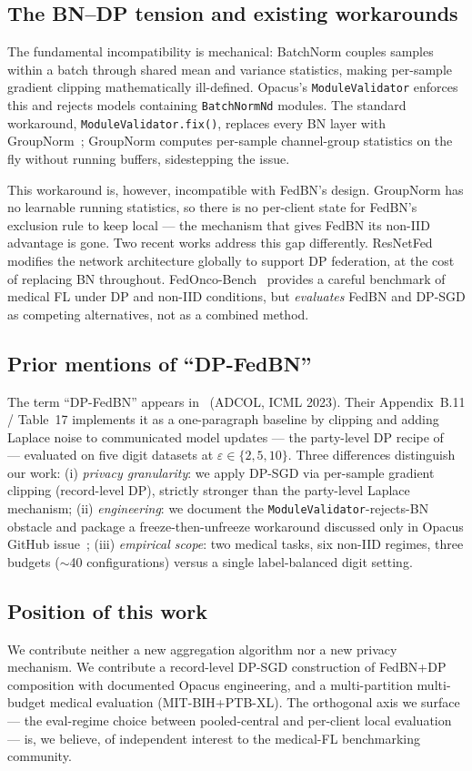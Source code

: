 \documentclass[conference]{IEEEtran}
\newcommand{\code}[1]{\texttt{\small #1}}
\begin{document}
\subsection{The BN--DP tension and existing workarounds}
The fundamental incompatibility is mechanical: BatchNorm couples samples within a batch through shared mean and variance statistics, making per-sample gradient clipping mathematically ill-defined. Opacus's \code{ModuleValidator} enforces this and rejects models containing \code{BatchNormNd} modules. The standard workaround, \code{ModuleValidator.fix()}, replaces every BN layer with GroupNorm~\cite{groupnorm}; GroupNorm computes per-sample channel-group statistics on the fly without running buffers, sidestepping the issue.

This workaround is, however, incompatible with FedBN's design. GroupNorm has no learnable running statistics, so there is no per-client state for FedBN's exclusion rule to keep local --- the mechanism that gives FedBN its non-IID advantage is gone. Two recent works address this gap differently. ResNetFed~\cite{resnetfed} modifies the network architecture globally to support DP federation, at the cost of replacing BN throughout. FedOnco-Bench~\cite{fedonco} provides a careful benchmark of medical FL under DP and non-IID conditions, but \emph{evaluates} FedBN and DP-SGD as competing alternatives, not as a combined method.

\subsection{Prior mentions of ``DP-FedBN''}
The term ``DP-FedBN'' appears in~\cite{adcol} (ADCOL, ICML 2023). Their Appendix~B.11 / Table~17 implements it as a one-paragraph baseline by clipping and adding Laplace noise to communicated model updates --- the party-level DP recipe of~\cite{geyer} --- evaluated on five digit datasets at $\varepsilon \in \{2,5,10\}$. Three differences distinguish our work: (i) \emph{privacy granularity}: we apply DP-SGD via per-sample gradient clipping (record-level DP), strictly stronger than the party-level Laplace mechanism; (ii) \emph{engineering}: we document the \code{ModuleValidator}-rejects-BN obstacle and package a freeze-then-unfreeze workaround discussed only in Opacus GitHub issue~\cite{opacusissue}; (iii) \emph{empirical scope}: two medical tasks, six non-IID regimes, three budgets ($\sim$40 configurations) versus a single label-balanced digit setting.

\subsection{Position of this work}
We contribute neither a new aggregation algorithm nor a new privacy mechanism. We contribute a record-level DP-SGD construction of FedBN+DP composition with documented Opacus engineering, and a multi-partition multi-budget medical evaluation (MIT-BIH+PTB-XL). The orthogonal axis we surface --- the eval-regime choice between pooled-central and per-client local evaluation --- is, we believe, of independent interest to the medical-FL benchmarking community.
\end{document}
